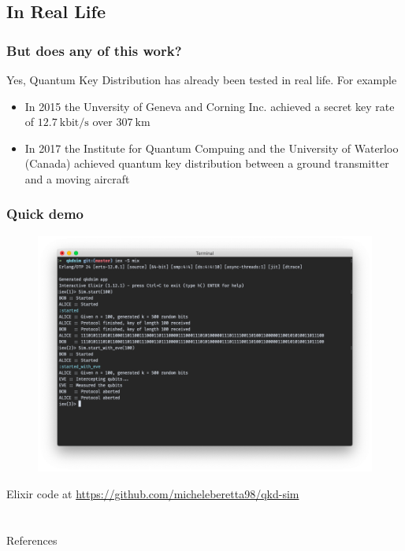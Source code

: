 \documentclass{beamer}
\begin{document}
  \subsection{In Real Life}
  \begin{frame}
    \frametitle{But does any of this work?}
    Yes, Quantum Key Distribution has already been tested in real life.
    For example
    \begin{itemize}
      \item In 2015 the Unversity of Geneva and Corning Inc. achieved a secret key
            rate of $12.7\ \mathrm{kbit/s}$ over $307\ \mathrm{km}$ \cite{qkd}
      \item In 2017 the Institute for Quantum Compuing and the University of Waterloo (Canada) achieved
            quantum key distribution between a ground transmitter and a moving aircraft \cite{airborne}
    \end{itemize}
  \end{frame}

  \begin{frame}[plain]
    \frametitle{Quick demo}
    \begin{figure}[H]
      \centering
      \includegraphics[width=0.9\linewidth]{qkd-bb84-elixir.png}
    \end{figure}

    \small{Elixir code at \url{https://github.com/micheleberetta98/qkd-sim}}
  \end{frame}

  \section*{}
  \begin{frame}[plain]{References}
    \nocite{*}
    
    
  \end{frame}
\end{document}
